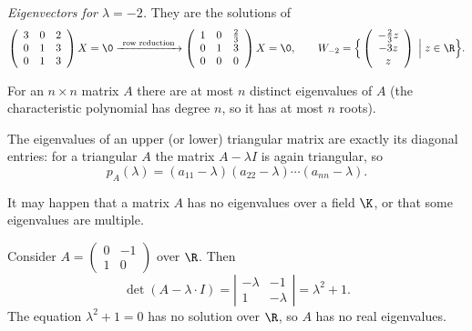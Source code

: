 \begin{example}
\noindent\emph{Eigenvectors for $\lambda = -2$.} They are the solutions of
\[
\left( \begin{array}{ccc} 3 & 0 & 2\\ 0 & 1 & 3\\ 0 & 1 & 3 \end{array} \right)X = \0
\xrightarrow{\ \text{row reduction}\ }
\left( \begin{array}{ccc} 1 & 0 & \tfrac{2}{3}\\ 0 & 1 & 3\\ 0 & 0 & 0 \end{array} \right)X = \0,
\qquad
W_{-2} = \Big\{ \left( \begin{array}{c} -\tfrac{2}{3}z \\ -3z \\ z \end{array} \right) \;\Big|\; z\in \R \Big\}.
\]
\end{example}

\begin{fact}
For an $n\times n$ matrix $A$ there are at most $n$ distinct eigenvalues of $A$ (the characteristic
polynomial has degree $n$, so it has at most $n$ roots).
\end{fact}

\begin{fact}
The eigenvalues of an upper (or lower) triangular matrix are exactly its diagonal entries: for a triangular
$A$ the matrix $A-\lambda I$ is again triangular, so
\[
p_A(\lambda) = (a_{11}-\lambda)(a_{22}-\lambda)\cdots(a_{nn}-\lambda).
\]
\end{fact}

\begin{remark}
It may happen that a matrix $A$ has no eigenvalues over a field $\K$, or that some eigenvalues are multiple.
\end{remark}

\begin{example}
Consider $A = \left( \begin{smallmatrix} 0 & -1\\ 1 & 0 \end{smallmatrix} \right)$ over $\R$. Then
\[
\det(A-\lambda\cdot I) = \left| \begin{array}{cc} -\lambda & -1\\ 1 & -\lambda \end{array} \right| = \lambda^2 + 1.
\]
The equation $\lambda^2+1 = 0$ has no solution over $\R$, so $A$ has no real eigenvalues.
\end{example}

